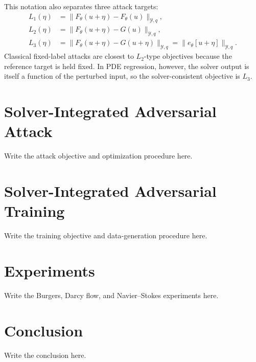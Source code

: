 \documentclass[letterpaper]{article} %
\begin{document}
This notation also separates three attack targets:
\begin{align}
  L_1(\eta) &= \|F_\theta(u+\eta)-F_\theta(u)\|_{\mathcal{Y},q},\\
  L_2(\eta) &= \|F_\theta(u+\eta)-G(u)\|_{\mathcal{Y},q},\\
  L_3(\eta) &= \|F_\theta(u+\eta)-G(u+\eta)\|_{\mathcal{Y},q}
             =\|e_\theta[u+\eta]\|_{\mathcal{Y},q}.
\end{align}
Classical fixed-label attacks are closest to $L_2$-type objectives because
the reference target is held fixed. In PDE regression, however, the solver
output is itself a function of the perturbed input, so the solver-consistent
objective is $L_3$.

\section{Solver-Integrated Adversarial Attack}

Write the attack objective and optimization procedure here.

\section{Solver-Integrated Adversarial Training}

Write the training objective and data-generation procedure here.

\section{Experiments}

Write the Burgers, Darcy flow, and Navier--Stokes experiments here.

\section{Conclusion}

Write the conclusion here.


\end{document}

